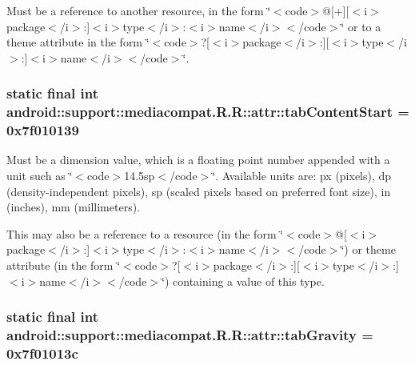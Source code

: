 Must be a reference to another resource, in the form \char`\"{}$<$code$>$@\mbox{[}+\mbox{]}\mbox{[}$<$i$>$package$<$/i$>$:\mbox{]}$<$i$>$type$<$/i$>$:$<$i$>$name$<$/i$>$$<$/code$>$\char`\"{} or to a theme attribute in the form \char`\"{}$<$code$>$?\mbox{[}$<$i$>$package$<$/i$>$:\mbox{]}\mbox{[}$<$i$>$type$<$/i$>$:\mbox{]}$<$i$>$name$<$/i$>$$<$/code$>$\char`\"{}. \hypertarget{classandroid_1_1support_1_1mediacompat_1_1_r_1_1attr_683e415d24634a8f9c6f789b333ef0ec}{
\subsubsection[{tabContentStart}]{\setlength{\rightskip}{0pt plus 5cm}static final int android::support::mediacompat.R.R::attr::tabContentStart = 0x7f010139}}
\label{classandroid_1_1support_1_1mediacompat_1_1_r_1_1attr_683e415d24634a8f9c6f789b333ef0ec}


Must be a dimension value, which is a floating point number appended with a unit such as \char`\"{}$<$code$>$14.5sp$<$/code$>$\char`\"{}. Available units are: px (pixels), dp (density-independent pixels), sp (scaled pixels based on preferred font size), in (inches), mm (millimeters). 

This may also be a reference to a resource (in the form \char`\"{}$<$code$>$@\mbox{[}$<$i$>$package$<$/i$>$:\mbox{]}$<$i$>$type$<$/i$>$:$<$i$>$name$<$/i$>$$<$/code$>$\char`\"{}) or theme attribute (in the form \char`\"{}$<$code$>$?\mbox{[}$<$i$>$package$<$/i$>$:\mbox{]}\mbox{[}$<$i$>$type$<$/i$>$:\mbox{]}$<$i$>$name$<$/i$>$$<$/code$>$\char`\"{}) containing a value of this type. \hypertarget{classandroid_1_1support_1_1mediacompat_1_1_r_1_1attr_8ea658ff6b4e9190f14e265d82b9a396}{
\subsubsection[{tabGravity}]{\setlength{\rightskip}{0pt plus 5cm}static final int android::support::mediacompat.R.R::attr::tabGravity = 0x7f01013c}}
\label{classandroid_1_1support_1_1mediacompat_1_1_r_1_1attr_8ea658ff6b4e9190f14e265d82b9a396}



